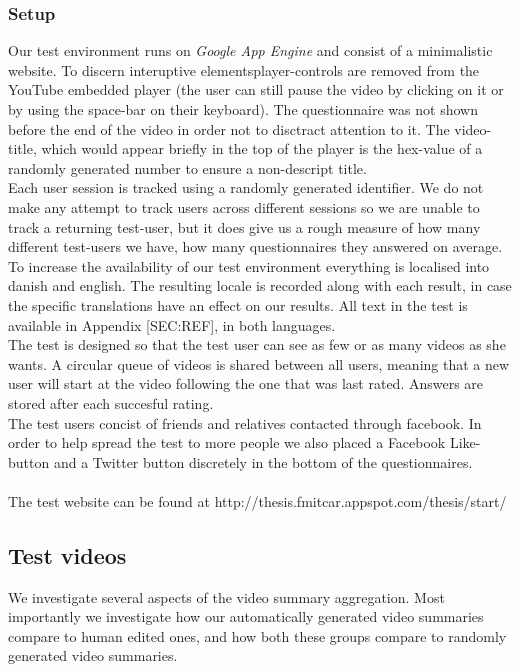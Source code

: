 \subsubsection{Setup}
%
Our test environment runs on \textit{Google App Engine} and consist of a minimalistic website. To discern interuptive elementsplayer-controls are removed from the YouTube embedded player (the user can still pause the video by clicking on it or by using the space-bar on their keyboard). The questionnaire was not shown before the end of the video in order not to disctract attention to it. The video-title, which would appear briefly in the top of the player is the hex-value of a randomly generated number to ensure a non-descript title.\\
Each user session is tracked using a randomly generated identifier. We do not make any attempt to track users across different sessions so we are unable to track a returning test-user, but it does give us a rough measure of how many different test-users we have, how many questionnaires they answered on average.\\
To increase the availability of our test environment everything is localised into danish and english. The resulting locale is recorded along with each result, in case the specific translations have an effect on our results. All text in the test is available in Appendix [SEC:REF], in both languages.\\
The test is designed so that the test user can see as few or as many videos as she wants. A circular queue of videos is shared between all users, meaning that a new user will start at the video following the one that was last rated. Answers are stored after each succesful rating.\\
The test users concist of friends and relatives contacted through facebook. In order to help spread the test to more people we also placed a Facebook Like-button and a Twitter button discretely in the bottom of the questionnaires.\\\\
%
The test website can be found at http://thesis.fmitcar.appspot.com/thesis/start/
%
\subsection{Test videos}
%
We investigate several aspects of the video summary aggregation. Most importantly we investigate how our automatically generated video summaries compare to human edited ones, and how both these groups compare to randomly generated video summaries.
%
